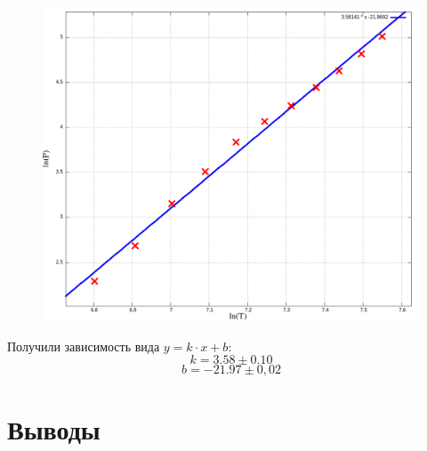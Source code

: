 \documentclass{article}
\begin{document}
\begin{figure}[H]
	\includegraphics[width=\textwidth]{plot.png}
\end{figure}

Получили зависимость вида \( y = k\cdot x + b \):
\[ k = 3.58 \pm 0.10 \]
\[ b = -21.97 \pm 0,02 \]

\section{Выводы}
\end{document}

